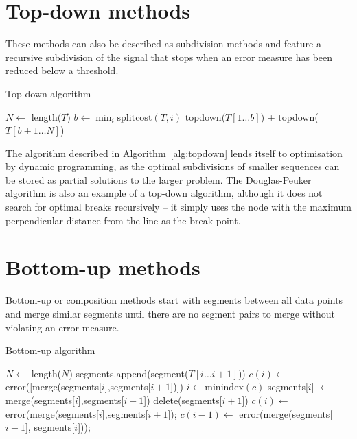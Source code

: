 \section{Top-down methods}
These methods can also be described as subdivision methods and feature
a recursive subdivision of the signal that stops when an error measure
has been reduced below a threshold.
\begin{algorithm}
  \caption{Top-down algorithm}
  \label{alg:topdown}
  \begin{algorithmic}
    \Else
      \State $N \gets $ length($T$)
      \State $b \gets \min_i{\mathrm{splitcost}(T,i)}$ 
      \Return topdown($T[1\dots b]$) + topdown($T[b+1\dots N]$) 
    \EndIf
    \EndFunction
\end{algorithmic}
\end{algorithm}
The algorithm described in Algorithm~\ref{alg:topdown} lends itself to
optimisation by dynamic programming, as the optimal subdivisions of
smaller sequences can be stored as partial solutions to the larger
problem.  The Douglas-Peuker algorithm \citep{douglas.peucker1973algorithms}
is also an example of a top-down algorithm, although it does not
search for optimal breaks recursively -- it simply uses the node with
the maximum perpendicular distance from the line as the break point.

\section{Bottom-up methods}
Bottom-up or composition methods start with segments between
all data points and merge similar segments until there are no segment
pairs to merge without violating an error measure.

\begin{algorithm}
  \caption{Bottom-up algorithm}
  \label{alg:bottomup}
  \begin{algorithmic}
    \State $N \gets $ length($N$)
     
    \State segments.append(segment($T[i\dots i+1]$))
    \EndFor
     
    \State $c(i) \gets $error([merge(segments[$i$],segments[$i+1$])])
    \EndFor
    \State $i \gets \mathrm{minindex}(c)$ 
    \State segments[$i$] $\gets$ merge(segments[$i$],segments[$i+1$]) 
    \State delete(segments[$i+1$]) 
    \State $c(i) \gets $error(merge(segments[$i$],segments[$i+1$]); 
    \State $c(i-1) \gets $ error(merge(segments[$i-1$], segments[$i$])); 
    \EndWhile
    \EndFunction
  \end{algorithmic}
\end{algorithm}

